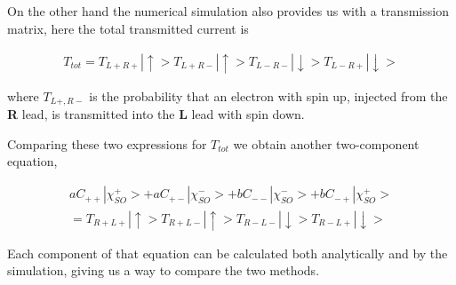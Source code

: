 \documentclass[11pt]{article}
\begin{document}
On the other hand the numerical simulation also provides us with a
transmission matrix, here the total transmitted current is 

\begin{align*}
	T_{tot} = T_{L+R+} |\uparrow>
              T_{L+R-} |\uparrow>
              T_{L-R-} |\downarrow>
              T_{L-R+} |\downarrow>
\end{align*}

where $T_{L+,R-}$ is the probability that an electron with spin up, injected from
the \textbf{R} lead, is transmitted into the \textbf{L} lead with spin down.

Comparing these two expressions for $T_{tot}$ we obtain another two-component
equation,

\begin{align*}
      a C_{++}|\chi_{SO}^+>
    + a C_{+-}|\chi_{SO}^->
    + b C_{--}|\chi_{SO}^->
    + b C_{-+}|\chi_{SO}^+>\\
	 = T_{R+L+} |\uparrow>
       T_{R+L-} |\uparrow>
       T_{R-L-} |\downarrow>
       T_{R-L+} |\downarrow>
\end{align*}

Each component of that equation can be calculated both analytically and by the
simulation, giving us a way to compare the two methods.
\end{document}
